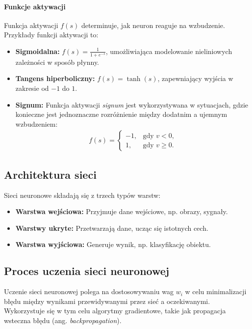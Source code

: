 \documentclass[a4paper,twoside,12pt]{book}
\begin{document}
\paragraph{Funkcje aktywacji}
Funkcja aktywacji \(f(s)\) determinuje, jak neuron reaguje na wzbudzenie. Przykłady funkcji aktywacji to:
\begin{itemize}
    \item \textbf{Sigmoidalna:} \(f(s) = \frac{1}{1 + e^{-s}}\), umożliwiająca modelowanie nieliniowych zależności w sposób płynny.
    \item \textbf{Tangens hiperboliczny:} \(f(s) = \tanh(s)\), zapewniający wyjścia w zakresie od \(-1\) do \(1\).
    \item \textbf{Signum:} Funkcja aktywacji \textit{signum} jest wykorzystywana w sytuacjach, gdzie konieczne jest jednoznaczne rozróżnienie między dodatnim a ujemnym wzbudzeniem:
    \begin{align}
        f(s) =
        \begin{cases} 
            -1, & \text{gdy } v < 0, \\
             1, & \text{gdy } v \geq 0.
        \end{cases}
    \end{align}
\end{itemize}

\newpage

\subsection{Architektura sieci}
Sieci neuronowe składają się z trzech typów warstw:
\begin{itemize}
    \item \textbf{Warstwa wejściowa:} Przyjmuje dane wejściowe, np. obrazy, sygnały.
    \item \textbf{Warstwy ukryte:} Przetwarzają dane, ucząc się istotnych cech.
    \item \textbf{Warstwa wyjściowa:} Generuje wynik, np. klasyfikację obiektu.
\end{itemize}

\subsection{Proces uczenia sieci neuronowej}
Uczenie sieci neuronowej polega na dostosowywaniu wag \(w_i\) w celu minimalizacji błędu między wynikami przewidywanymi przez sieć a oczekiwanymi. Wykorzystuje się w tym celu algorytmy gradientowe, takie jak propagacja wsteczna błędu (ang. \textit{backpropagation}).
\end{document}
